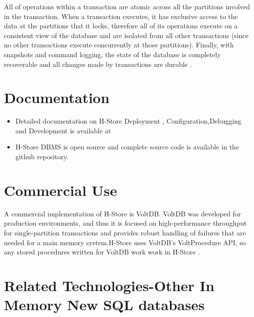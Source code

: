 \documentclass[9pt,twocolumn,twoside]{../../styles/osajnl}
\begin{document}
All of operations within a transaction are atomic across all the partitions 
involved in the transaction. When a transaction executes, it has exclusive 
access to the data at the partitions that it locks, therefore all of its 
operations execute on a consistent view of the database and are isolated from 
all other transactions (since no other transactions execute concurrently at 
those partitions). Finally, with snapshots and command logging, the state of 
the database is completely recoverable and all changes made by transactions are durable \cite{www-H-StoreArch} .

\section{Documentation}

\begin{itemize}
\renewcommand{\labelitemi}{\scriptsize$\bullet$} 
\item Detailed documentation on H-Store  Deployment , Configuration,Debugging 
and Development is available at  \cite{www-H-Store}
\item H-Store DBMS is open source and complete source code is available in the  
\cite{github-H-Store} github repository. 
\end{itemize}

\section{Commercial Use}

A commercial implementation of H-Store is VoltDB. VoltDB was developed for 
production environments, and thus it is focused on high-performance throughput 
for single-partition transactions and provides robust handling of failures that are needed for a main memory system.H-Store uses VoltDB’s VoltProcedure API, so any stored procedures written for VoltDB work work in H-Store 
\cite{www-H-StoreFaq}. 

\section{Related Technologies-Other In Memory New SQL databases}
\end{document}
